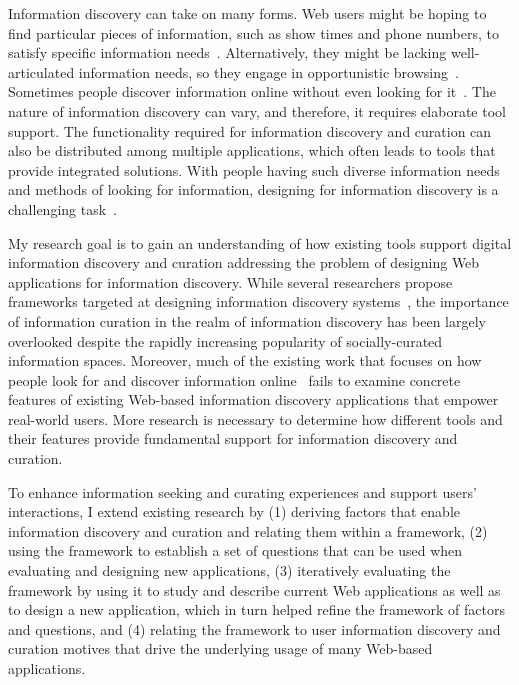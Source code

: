 Information discovery can take on many forms. Web users might be hoping to find particular pieces of information, such as show times and phone numbers, to satisfy specific information needs~\cite{proper1999information}. Alternatively, they might be lacking well-articulated information needs, so they engage in opportunistic browsing~\cite{lindley2012s}. Sometimes people discover information online without even looking for it~\cite{bates1986exploratory}. The nature of information discovery can vary, and therefore, it requires elaborate tool support. The functionality required for information discovery and curation can also be distributed among multiple applications, which often leads to tools that provide integrated solutions. With people having such diverse information needs and methods of looking for information, designing for information discovery is a challenging task~\cite{conaway2010designing, marchionini2006exploratory}.

My research goal is to gain an understanding of how existing tools support digital information discovery and curation addressing the problem of designing Web applications for information discovery. While several researchers propose frameworks targeted at designing information discovery systems~\cite{proper1999information, kerne2004information}, the importance of information curation in the realm of information discovery has been largely overlooked despite the rapidly increasing popularity of socially-curated information spaces. Moreover, much of the existing work that focuses on how people look for and discover information online~\cite{bates1986exploratory, choo2000information, ellis1989behavioural, kellar2006goal, lindley2012s, morrison2001taxonomic, sellen2002knowledge} fails to examine concrete features of existing Web-based information discovery applications that empower real-world users. More research is necessary to determine how different tools and their features provide fundamental support for information discovery and curation.

To enhance information seeking and curating experiences and support users' interactions, I extend existing research by (1) deriving factors that enable information discovery and curation and relating them within a framework, (2) using the framework to establish a set of questions that can be used when evaluating and designing new applications, (3) iteratively evaluating the framework by using it to study and describe current Web applications as well as to design a new application, which in turn helped refine the framework of factors and questions, and (4) relating the framework to user information discovery and curation motives that drive the underlying usage of many Web-based applications. 

